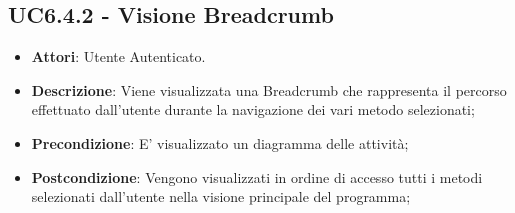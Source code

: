 \subsection{UC6.4.2 - Visione Breadcrumb} 
\label{ssec:UC6.4.2} 
\begin{itemize} 
\item \textbf{Attori}: Utente Autenticato.
\item \textbf{Descrizione}: Viene visualizzata una Breadcrumb che rappresenta il percorso effettuato dall'utente durante la navigazione dei vari metodo selezionati;
\item \textbf{Precondizione}: E' visualizzato un diagramma delle attività;
\item \textbf{Postcondizione}: Vengono visualizzati in ordine di accesso tutti i metodi selezionati dall'utente nella visione principale del programma;
\end{itemize} 
